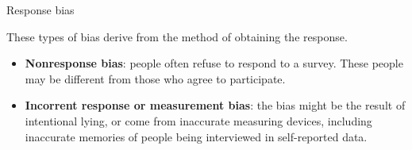 \documentclass[handout]{beamer}
\begin{document}
\begin{frame}{Response bias}
\scriptsize{
These types of bias derive from the method of obtaining the response.

\begin{itemize}
 \item \textbf{Nonresponse bias}: people often refuse to respond to a survey. These people may be different from those who agree to participate.
 
 \item \textbf{Incorrent response or measurement bias}: the bias might be the result of intentional lying, or come from inaccurate measuring devices, including inaccurate memories of people being interviewed in self-reported data.
 \begin{itemize}
 \end{itemize}

 
 
\end{itemize}


} 
\end{frame}
\end{document}

